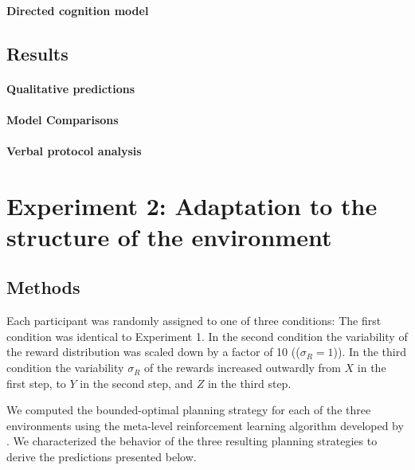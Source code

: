 \paragraph{Directed cognition model}


\subsection{Results}

\paragraph{Qualitative predictions}

\paragraph{Model Comparisons}

\paragraph{Verbal protocol analysis}

\section{Experiment 2: Adaptation to the structure of the environment}


\subsection{Methods}

Each participant was randomly assigned to one of three conditions: The first condition was identical to Experiment 1. In the second condition the variability of the reward distribution was scaled down by a factor of 10 (($\sigma_R=1$)). In the third condition the variability $\sigma_R$ of the rewards increased outwardly from $X$ in the first step, to $Y$ in the second step, and $Z$ in the third step.

We computed the bounded-optimal planning strategy for each of the three environments using the meta-level reinforcement learning algorithm developed by \cite{LiederCallawayGulKruegerGriffiths2017}. We characterized the behavior of the three resulting planning strategies to derive the predictions presented below.

